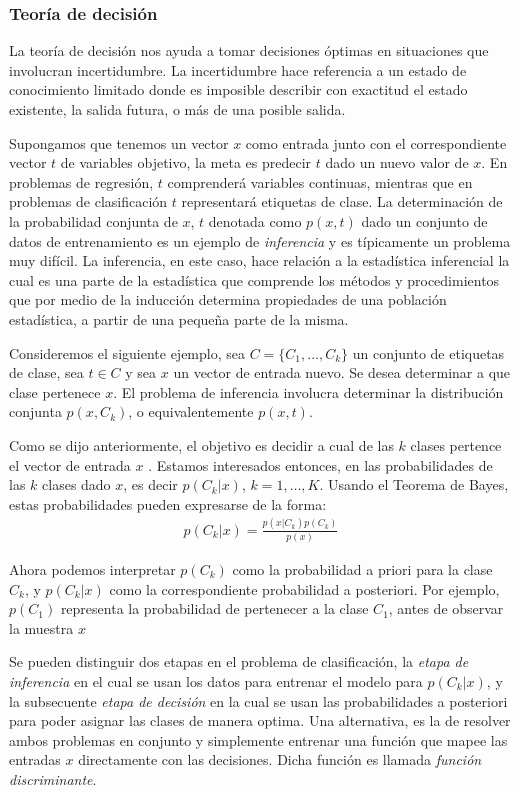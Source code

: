 \subsubsection{Teoría de decisión}
	
	La teoría de decisión nos ayuda a tomar decisiones óptimas en situaciones que involucran incertidumbre. La incertidumbre hace referencia a un estado de conocimiento limitado donde es imposible describir con exactitud el estado existente, la salida futura, o más de una posible salida.
	
	Supongamos que tenemos un vector $x$ como entrada junto con el correspondiente vector $t$ de variables objetivo, la meta es predecir $t$ dado un nuevo valor de $x$. En problemas de regresión, $t$ comprenderá variables continuas, mientras que en problemas de clasificación $t$ representará etiquetas de clase. La determinación de la probabilidad conjunta de $x$, $t$ denotada como $p(x,t)$ dado un conjunto de datos de entrenamiento es un ejemplo de \textit{inferencia} y es típicamente un problema muy difícil. La inferencia, en este caso, hace relación a la estadística inferencial la cual es una parte de la estadística que comprende los métodos y procedimientos que por medio de la inducción determina propiedades de una población estadística, a partir de una pequeña parte de la misma.
	
	Consideremos el siguiente ejemplo, sea $C=\{C_1,\dots,C_k\}$ un conjunto de etiquetas de clase, sea $t \in C$ y sea $x$ un vector de entrada nuevo. Se desea determinar a que clase pertenece $x$. El problema de inferencia involucra determinar la distribución conjunta $p(x,C_k)$, o equivalentemente $p(x,t)$.

	Como se dijo anteriormente, el objetivo es decidir a cual de las $k$ clases pertence el vector de entrada $x$ . Estamos interesados entonces, en las probabilidades de las $k$ clases dado $x$, es decir $p(C_k|x)$, $k=1,\dots,K$. Usando el Teorema de Bayes, estas probabilidades pueden expresarse de la forma:
		\begin{align*}
			p(C_k|x) = \frac{p(x|C_k)p(C_k)}{p(x)}
		\end{align*}

	Ahora podemos interpretar $p(C_k)$ como la probabilidad a priori para la clase $C_k$, y $p(C_k|x)$ como la correspondiente probabilidad a posteriori. Por ejemplo, $p(C_1)$ representa la probabilidad de pertenecer a la clase $C_1$, antes de observar la muestra $x$
	
	Se pueden distinguir dos etapas en el problema de clasificación, la \textit{etapa de inferencia} en el cual se usan los datos para entrenar el modelo para $p(C_k|x)$, y la subsecuente \textit{etapa de decisión} en la cual se usan las probabilidades a posteriori para poder asignar las clases de manera optima. Una alternativa, es la de resolver ambos problemas en conjunto y simplemente entrenar una función que mapee las entradas $x$ directamente con las decisiones. Dicha función es llamada \textit{función discriminante}.
	
